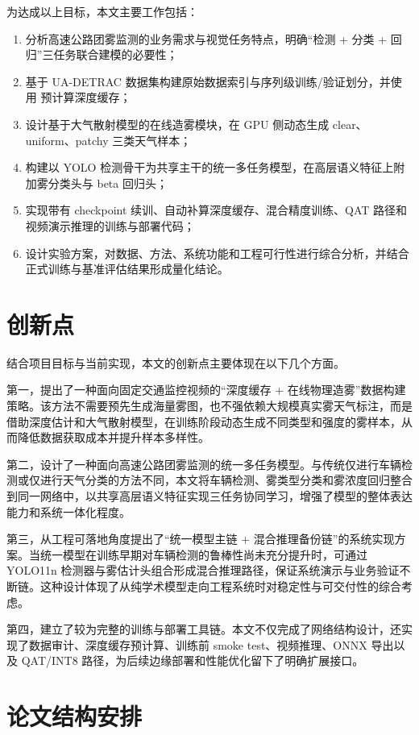 为达成以上目标，本文主要工作包括：

\begin{enumerate}[leftmargin=2.5em]
\item 分析高速公路团雾监测的业务需求与视觉任务特点，明确“检测 + 分类 + 回归”三任务联合建模的必要性；
\item 基于 UA-DETRAC 数据集构建原始数据索引与序列级训练/验证划分，并使用  预计算深度缓存\cite{uadetrac,midas}；
\item 设计基于大气散射模型的在线造雾模块，在 GPU 侧动态生成 clear、uniform、patchy 三类天气样本；
\item 构建以 YOLO 检测骨干为共享主干的统一多任务模型，在高层语义特征上附加雾分类头与 beta 回归头；
\item 实现带有 checkpoint 续训、自动补算深度缓存、混合精度训练、QAT 路径和视频演示推理的训练与部署代码；
\item 设计实验方案，对数据、方法、系统功能和工程可行性进行综合分析，并结合正式训练与基准评估结果形成量化结论。
\end{enumerate}

\section{创新点}

结合项目目标与当前实现，本文的创新点主要体现在以下几个方面。

第一，提出了一种面向固定交通监控视频的“深度缓存 + 在线物理造雾”数据构建策略。该方法不需要预先生成海量雾图，也不强依赖大规模真实雾天气标注，而是借助深度估计和大气散射模型，在训练阶段动态生成不同类型和强度的雾样本，从而降低数据获取成本并提升样本多样性。

第二，设计了一种面向高速公路团雾监测的统一多任务模型。与传统仅进行车辆检测或仅进行天气分类的方法不同，本文将车辆检测、雾类型分类和雾浓度回归整合到同一网络中，以共享高层语义特征实现三任务协同学习，增强了模型的整体表达能力和系统一体化程度。

第三，从工程可落地角度提出了“统一模型主链 + 混合推理备份链”的系统实现方案。当统一模型在训练早期对车辆检测的鲁棒性尚未充分提升时，可通过 YOLO11n 检测器与雾估计头组合形成混合推理路径，保证系统演示与业务验证不断链。这种设计体现了从纯学术模型走向工程系统时对稳定性与可交付性的综合考虑。

第四，建立了较为完整的训练与部署工具链。本文不仅完成了网络结构设计，还实现了数据审计、深度缓存预计算、训练前 smoke test、视频推理、ONNX 导出以及 QAT/INT8 路径，为后续边缘部署和性能优化留下了明确扩展接口。

\section{论文结构安排}

